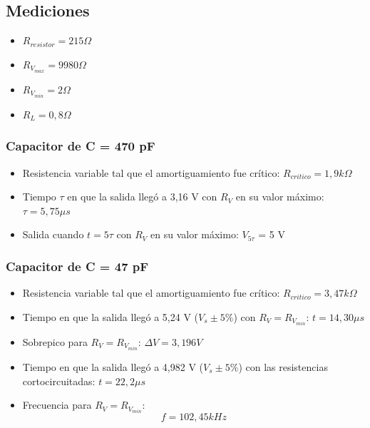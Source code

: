 \documentclass{article}
\begin{document}
    \subsection{Mediciones}
 
        \begin{itemize}
            \item $ R_{resistor} = 215 \Omega $
            \item $ R_{V_{max}} = 9980 \Omega $
            \item $ R_{V_{min}} = 2 \Omega $
            \item $ R_L = 0,8 \Omega $
        \end{itemize}
        
        \par
        \subsubsection*{Capacitor de C = 470 pF}
            \begin{itemize}
                \item Resistencia variable tal que el amortiguamiento fue crítico: $ R_{critico} = 1,9 k\Omega $ %
                \item Tiempo $\tau$ en que la salida llegó a 3,16 V con $ R_V $ en su valor máximo: $ \tau = 5,75 \mu s$ %
                \item Salida cuando $t=5\tau$ con $ R_V $ en su valor máximo: $V_{5\tau}$ = 5 V%
            \end{itemize}

        \par
        \subsubsection*{Capacitor de C = 47 pF}
            \begin{itemize}
                \item Resistencia variable tal que el amortiguamiento fue crítico: $ R_{critico} = 3,47 k\Omega $ %
                \item Tiempo en que la salida llegó a 5,24 V ($V_s \pm 5\% $) con $ R_V=R_{V_{min}}$: $ t = 14,30 \mu s$ %
                \item Sobrepico para $R_V = R_{V_{min}}$: $ \Delta V = 3,196 V $
                \item Tiempo en que la salida llegó a 4,982 V ($V_s \pm 5\% $) con las resistencias cortocircuitadas: $ t = 22,2 \mu s$ %
                \item Frecuencia para $ R_V = R_{V_{min}} $:
                \begin{equation*}
                    f = 102,45 kHz
                \end{equation*} \par
            \end{itemize}
\end{document}
